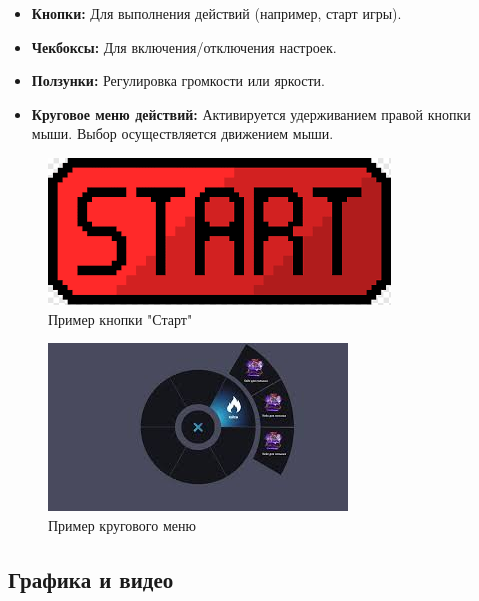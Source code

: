 \documentclass{article}
\begin{document}
	\begin{itemize}
		\item \textbf{Кнопки:} Для выполнения действий (например, старт игры).
		\item \textbf{Чекбоксы:} Для включения/отключения настроек.
		\item \textbf{Ползунки:} Регулировка громкости или яркости.
		\item \textbf{Круговое меню действий:} Активируется удерживанием правой кнопки мыши. Выбор осуществляется движением мыши.
	\end{itemize}
	\begin{figure}[h!]
		\centering
		\includegraphics[width=\textwidth]{images/startbutton.png}
		\caption{Пример кнопки "Старт"}
		\label{fig:startbutton}
	\end{figure}
	\begin{figure}[h!]
		\centering
		\includegraphics[width=\textwidth]{images/circlemenu.jpeg}
		\caption{Пример кругового меню}
		\label{fig:circlemenu}
	\end{figure}
	\newpage
	
	\subsection{Графика и видео}
\end{document}
